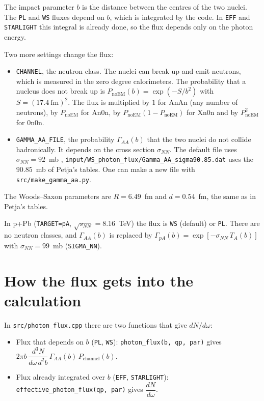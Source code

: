 \documentclass{article}
\begin{document}
The impact parameter $b$ is the distance between the centres of the two
nuclei. The \texttt{PL} and \texttt{WS} fluxes depend on $b$, which is integrated by the code. In \texttt{EFF} and \texttt{STARLIGHT} this
integral is already done, so the flux depends only on the photon energy.

Two more settings change the flux:
\begin{itemize}
\item \texttt{CHANNEL}, the neutron class. The nuclei can break up
  and emit neutrons, which is measured in the zero degree calorimeters. The
  probability that a nucleus does not break up is
  $P_\text{noEM}(b) = \exp(-S/b^2)$ with $S = (17.4~\text{fm})^2$. The flux is
  multiplied by $1$ for AnAn (any number of neutrons), by $P_\text{noEM}$ for
  An0n, by $P_\text{noEM}(1-P_\text{noEM})$ for Xn0n and by $P_\text{noEM}^2$
  for 0n0n.
\item \texttt{GAMMA\_AA\_FILE}, the probability $\Gamma_{AA}(b)$ that the two
  nuclei do not collide hadronically. It depends on the cross section
  $\sigma_{NN}$. The default file uses $\sigma_{NN} = 92$~mb , \texttt{input/WS\_photon\_flux/Gamma\_AA\_sigma90.85.dat} uses the
  $90.85$~mb of Petja's tables. One can make a new file with
  \texttt{src/make\_gamma\_aa.py}.
\end{itemize}
The Woods--Saxon parameters are $R = 6.49$~fm and $d = 0.54$~fm, the same as
in Petja's tables.

In p+Pb (\texttt{TARGET=pA}, $\sqrt{s_{NN}} = 8.16$~TeV) the flux is \texttt{WS}
(default) or \texttt{PL}. There are no neutron classes, and $\Gamma_{AA}(b)$ is
replaced by $\Gamma_{pA}(b) = \exp[-\sigma_{NN}\,T_A(b)]$ with
$\sigma_{NN} = 99$~mb (\texttt{SIGMA\_NN}).

\section{How the flux gets into the calculation}

In \texttt{src/photon\_flux.cpp} there are two functions that give $dN/d\omega$:

\begin{itemize}
\item Flux that depends on $b$ (\texttt{PL}, \texttt{WS}):
  \texttt{photon\_flux(b, qp, par)} gives
  $2\pi b\,\dfrac{d^3N}{d\omega\,d^2b}\,\Gamma_{AA}(b)\,P_\text{channel}(b)$.
\item Flux already integrated over $b$ (\texttt{EFF}, \texttt{STARLIGHT}):
  \texttt{effective\_photon\_flux(qp, par)} gives $\dfrac{dN}{d\omega}$.
\end{itemize}
\end{document}
